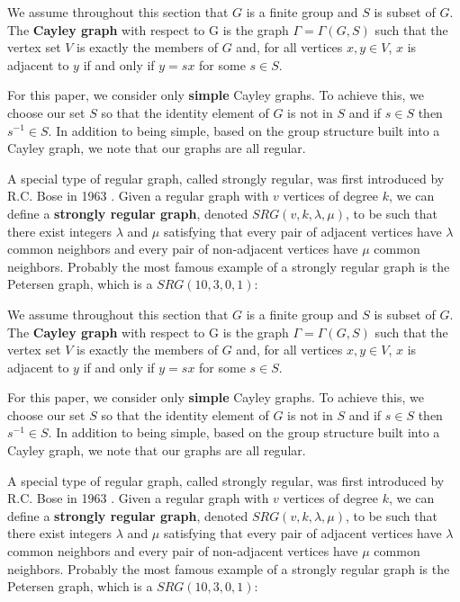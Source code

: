 We assume throughout this section that $G$ is a finite group and $S$ is subset of $G$. The \textbf{Cayley graph} with respect to G is the graph $\Gamma = \Gamma (G,S)$ such that the vertex set $V$ is exactly the members of $G$ and, for all vertices $x,y\in V$,  $x$ is adjacent to $y$ if and only if $y = sx$ for some $s\in S$.

For this paper, we consider only \textbf{simple} Cayley graphs. To achieve this, we choose our set $S$ so that the identity element of $G$ is not in $S$ and if $s\in S$ then $s^{-1}\in S$. In addition to being simple, based on the group structure built into a Cayley graph, we note that our graphs are all regular.

A special type of regular graph, called strongly regular, was first introduced by  R.C. Bose in 1963 \cite{BCN}. Given a regular graph with $v$ vertices of degree $k$, we can define a \textbf{strongly regular graph}, denoted $SRG(v,k,\lambda, \mu)$, to be such that there exist integers $\lambda$ and $\mu$ satisfying that every pair of adjacent vertices have $\lambda$ common neighbors and every pair of non-adjacent vertices have $\mu$ common neighbors. Probably the most famous example of a strongly regular graph is the Petersen graph, which is a $SRG(10,3,0,1)$:

We assume throughout this section that $G$ is a finite group and $S$ is subset of $G$. The \textbf{Cayley graph} with respect to G is the graph $\Gamma = \Gamma (G,S)$ such that the vertex set $V$ is exactly the members of $G$ and, for all vertices $x,y\in V$,  $x$ is adjacent to $y$ if and only if $y = sx$ for some $s\in S$.

For this paper, we consider only \textbf{simple} Cayley graphs. To achieve this, we choose our set $S$ so that the identity element of $G$ is not in $S$ and if $s\in S$ then $s^{-1}\in S$. In addition to being simple, based on the group structure built into a Cayley graph, we note that our graphs are all regular.

A special type of regular graph, called strongly regular, was first introduced by  R.C. Bose in 1963 \cite{BCN}. Given a regular graph with $v$ vertices of degree $k$, we can define a \textbf{strongly regular graph}, denoted $SRG(v,k,\lambda, \mu)$, to be such that there exist integers $\lambda$ and $\mu$ satisfying that every pair of adjacent vertices have $\lambda$ common neighbors and every pair of non-adjacent vertices have $\mu$ common neighbors. Probably the most famous example of a strongly regular graph is the Petersen graph, which is a $SRG(10,3,0,1)$:



